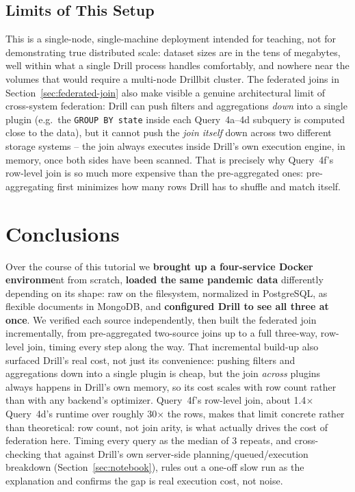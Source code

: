 \documentclass[11pt,a4paper]{article}
\begin{document}
\subsection{Limits of This Setup}
This is a single-node, single-machine deployment intended for teaching, not for
demonstrating true distributed scale: dataset sizes are in the tens of megabytes, well
within what a single Drill process handles comfortably, and nowhere near the volumes
that would require a multi-node Drillbit cluster. The federated joins in
Section~\ref{sec:federated-join} also make visible a genuine architectural limit of
cross-system federation: Drill can push filters and aggregations \emph{down} into a
single plugin (e.g.\ the \texttt{GROUP BY state} inside each Query~4a--4d subquery is
computed close to the data), but it cannot push the \emph{join itself} down across two
different storage systems -- the join always executes inside Drill's own execution
engine, in memory, once both sides have been scanned. That is precisely why Query~4f's
row-level join is so much more expensive than the pre-aggregated ones: pre-aggregating
first minimizes how many rows Drill has to shuffle and match itself.


\section{Conclusions}
\label{sec:conclusions}
Over the course of this tutorial we \textbf{brought up a four-service Docker environme}nt from
scratch, \textbf{loaded the same pandemic data} differently depending on its shape: raw on
the filesystem, normalized in PostgreSQL, as flexible documents in MongoDB, and
\textbf{configured Drill to see all three at once}. We verified each source independently,
then built the federated join incrementally, from pre-aggregated two-source joins up
to a full three-way, row-level join, timing every step along the way. 
That incremental build-up also surfaced Drill's real cost, not just its convenience:
pushing filters and aggregations down into a single plugin is cheap, but the join
\emph{across} plugins always happens in Drill's own memory, so its cost scales with
row count rather than with any backend's optimizer. Query~4f's row-level join, about
1.4$\times$ Query~4d's runtime over roughly 30$\times$ the rows, makes that limit
concrete rather than theoretical: row count, not join arity, is what actually drives
the cost of federation here. Timing every query as the median of 3 repeats, and
cross-checking that against Drill's own server-side planning/queued/execution
breakdown (Section~\ref{sec:notebook}), rules out a one-off slow run as the
explanation and confirms the gap is real execution cost, not noise.
\newpage
\appendix
\end{document}
